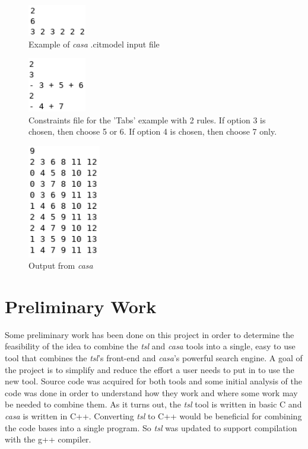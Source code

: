 \documentclass[a4full,12pt]{article}
\begin{document}
\begin{figure}[htb]
\centering
\includegraphics[width=1in,keepaspectratio]{images/casa_citmodel_input.png}
\caption{Example of \emph{casa} .citmodel input file}
\label{fig:casa_citmodel_input}
\end{figure}

\begin{figure}[htb]
\centering
\includegraphics[width=1in,keepaspectratio]{images/casa_constraints.png}
\caption{Constraints file for the 'Tabs' example with 2 rules. If option 3 is chosen, then choose 5 or 6. If option 4 is chosen, then choose 7 only.}
\label{fig:casa_constraints}
\end{figure}

\begin{figure}[htb]
\centering
\includegraphics[width=1.25in,keepaspectratio]{images/casa_output.png}
\caption{Output from \emph{casa}}
\label{fig:casa_output}
\end{figure}

\section{Preliminary Work}
Some preliminary work has been done on this project in order to determine the
  feasibility of the idea to combine the \emph{tsl} and \emph{casa} tools into 
  a single, easy to use tool that combines the \emph{tsl}'s front-end and \emph{casa}'s powerful search engine. A goal of the project is to simplify and reduce the
  effort a user needs to put in to use the new tool. Source code was acquired for
  both tools and some initial analysis of the code was done in order to understand
  how they work and where some work may be needed to combine them. As it
  turns out, the \emph{tsl} tool is written in basic C and \emph{casa} is written
  in C++. Converting \emph{tsl} to C++ would be beneficial for combining the 
  code bases into a single program. So \emph{tsl} was updated to support compilation
  with the g++ compiler.
\end{document}
